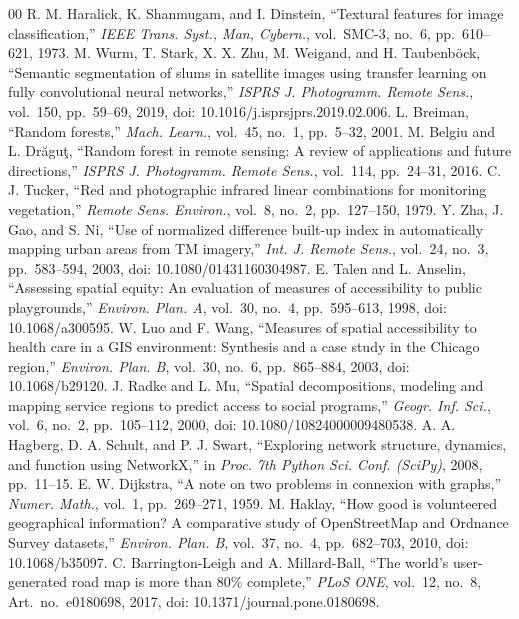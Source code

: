 \documentclass[conference]{IEEEtran}
\begin{document}
\begin{thebibliography}{00}
 R. M. Haralick, K. Shanmugam, and I. Dinstein, ``Textural features for image classification,'' \textit{IEEE Trans. Syst., Man, Cybern.}, vol.~SMC-3, no.~6, pp.~610--621, 1973.
 M. Wurm, T. Stark, X. X. Zhu, M. Weigand, and H. Taubenb\"{o}ck, ``Semantic segmentation of slums in satellite images using transfer learning on fully convolutional neural networks,'' \textit{ISPRS J. Photogramm. Remote Sens.}, vol.~150, pp.~59--69, 2019, doi: 10.1016/j.isprsjprs.2019.02.006.
 L. Breiman, ``Random forests,'' \textit{Mach. Learn.}, vol.~45, no.~1, pp.~5--32, 2001.
 M. Belgiu and L. Dr\u{a}gu\c{t}, ``Random forest in remote sensing: A review of applications and future directions,'' \textit{ISPRS J. Photogramm. Remote Sens.}, vol.~114, pp.~24--31, 2016.
 C. J. Tucker, ``Red and photographic infrared linear combinations for monitoring vegetation,'' \textit{Remote Sens. Environ.}, vol.~8, no.~2, pp.~127--150, 1979.
 Y. Zha, J. Gao, and S. Ni, ``Use of normalized difference built-up index in automatically mapping urban areas from TM imagery,'' \textit{Int. J. Remote Sens.}, vol.~24, no.~3, pp.~583--594, 2003, doi: 10.1080/01431160304987.
 E. Talen and L. Anselin, ``Assessing spatial equity: An evaluation of measures of accessibility to public playgrounds,'' \textit{Environ. Plan. A}, vol.~30, no.~4, pp.~595--613, 1998, doi: 10.1068/a300595.
 W. Luo and F. Wang, ``Measures of spatial accessibility to health care in a GIS environment: Synthesis and a case study in the Chicago region,'' \textit{Environ. Plan. B}, vol.~30, no.~6, pp.~865--884, 2003, doi: 10.1068/b29120.
 J. Radke and L. Mu, ``Spatial decompositions, modeling and mapping service regions to predict access to social programs,'' \textit{Geogr. Inf. Sci.}, vol.~6, no.~2, pp.~105--112, 2000, doi: 10.1080/10824000009480538.
 A. A. Hagberg, D. A. Schult, and P. J. Swart, ``Exploring network structure, dynamics, and function using NetworkX,'' in \textit{Proc. 7th Python Sci. Conf. (SciPy)}, 2008, pp.~11--15.
 E. W. Dijkstra, ``A note on two problems in connexion with graphs,'' \textit{Numer. Math.}, vol.~1, pp.~269--271, 1959.
 M. Haklay, ``How good is volunteered geographical information? A comparative study of OpenStreetMap and Ordnance Survey datasets,'' \textit{Environ. Plan. B}, vol.~37, no.~4, pp.~682--703, 2010, doi: 10.1068/b35097.
 C. Barrington-Leigh and A. Millard-Ball, ``The world's user-generated road map is more than 80\% complete,'' \textit{PLoS ONE}, vol.~12, no.~8, Art.~no.~e0180698, 2017, doi: 10.1371/journal.pone.0180698.

\end{thebibliography}
\end{document}
